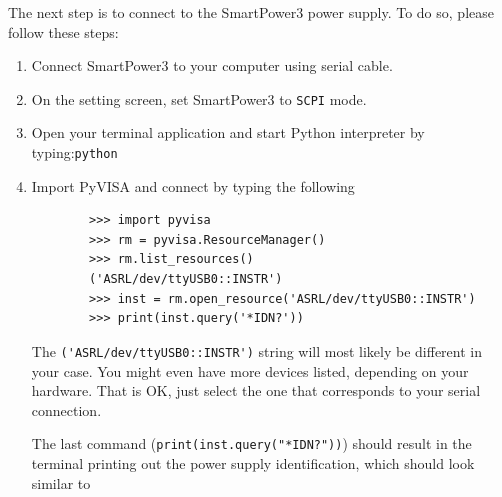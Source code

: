 \documentclass[a4paper,10pt]{article}
\begin{document}
The next step is to connect to the SmartPower3 power supply. To do so, please follow these steps:
\begin{enumerate}

    \item Connect SmartPower3 to your computer using serial cable.
    \item On the setting screen, set SmartPower3 to \verb|SCPI| mode.
    \item Open your terminal application and start Python interpreter by typing:\newline\verb|python|
    \item Import PyVISA and connect by typing the following
    \begin{verbatim}
        >>> import pyvisa
        >>> rm = pyvisa.ResourceManager()
        >>> rm.list_resources()
        ('ASRL/dev/ttyUSB0::INSTR')
        >>> inst = rm.open_resource('ASRL/dev/ttyUSB0::INSTR')
        >>> print(inst.query('*IDN?'))
    \end{verbatim}
    The \verb|('ASRL/dev/ttyUSB0::INSTR')| string will most likely be different in your case. You might even have more devices listed, depending on your hardware. That is OK, just select the one that corresponds to your serial connection.
    
    The last command (\verb|print(inst.query("*IDN?"))|) should result in the terminal printing out the power supply identification, which should look similar to 
    

\end{enumerate}
\end{document}
